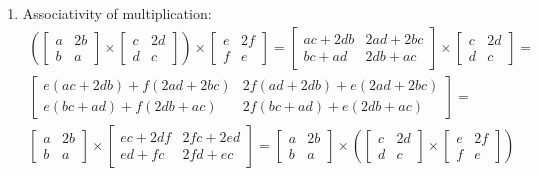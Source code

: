 \documentclass[11pt]{article}
\begin{document}
\begin{enumerate}
\item Associativity of multiplication:
\begin{align*}
  \left(\begin{bmatrix}
    a & 2b \\
    b & a
  \end{bmatrix} \times 
  \begin{bmatrix}
    c & 2d \\
    d & c
  \end{bmatrix}\right) \times 
  \begin{bmatrix}
    e & 2f \\
    f & e
  \end{bmatrix} =
  \begin{bmatrix}
    ac + 2db & 2ad + 2bc \\
    bc + ad & 2db + ac
  \end{bmatrix} \times 
  \begin{bmatrix}
    c & 2d \\
    d & c
  \end{bmatrix} = \\
  \begin{bmatrix}
    e(ac + 2db) + f(2ad + 2bc) & 2f(ad + 2db) + e(2ad + 2bc) \\
    e(bc + ad) + f(2db + ac) & 2f(bc + ad) + e(2db + ac)
  \end{bmatrix} = \\
  \begin{bmatrix}
    a & 2b \\
    b & a
  \end{bmatrix} \times
  \begin{bmatrix}
    ec + 2df & 2fc + 2ed \\
    ed + fc & 2fd + ec
  \end{bmatrix} =
  \begin{bmatrix}
    a & 2b \\
    b & a
  \end{bmatrix} \times 
  \left(\begin{bmatrix}
    c & 2d \\
    d & c
  \end{bmatrix} \times 
  \begin{bmatrix}
    e & 2f \\
    f & e
  \end{bmatrix}\right)
\end{align*}


\end{enumerate}
\end{document}
